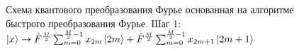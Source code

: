\begin{figure}
\centering



\caption{Схема квантового преобразования Фурье основанная на алгоритме
быстрого преобразования Фурье. Шаг 1: 
$\ket{x} \rightarrow
\hat{F}^{\frac{M}{2}} \sum_{m = 0}^{\frac{M}{2} - 1}x_{2m} \ket{2m} +
\hat{F}^{\frac{M}{2}} \sum_{m = 0}^{\frac{M}{2} - 1}x_{2m + 1} \ket{2m+1}$}
\label{figQuantCompQuantFourier1}
\end{figure}
